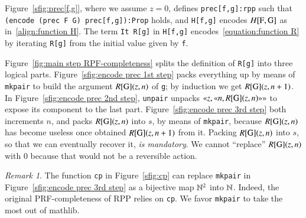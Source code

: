 \documentclass[preprint]{elsarticle}
\theoremstyle{remark}
\newtheorem{remark}{Remark}
\newcommand{\RPP}{\textsf{RPP}\xspace}
\newcommand{\PRF}{\textsf{PRF}\xspace}
\newcommand{\MATHLIB}{\textsf{mathlib}\xspace}
\begin{document}
Figure~\ref{sfig:prec[f,g]}, where we assume $ z = 0 $, defines \lstinline|prec[f,g]:rpp| such that \lstinline|(encode (prec F G) prec[f,g]):Prop| holds, and \lstinline|H[f,g]| encodes
$ H[\mbox{\lstinline|F|},\mbox{\lstinline|G|}]$ as in~\eqref{align:function H}.
The term \lstinline|It R[g]| in \lstinline|H[f,g]| encodes~\eqref{equation:function R} by iterating \lstinline|R[g]| from the initial value given by \lstinline|f|.


Figure~\ref{fig:main step RPF-completeness} splits the definition of \lstinline|R[g]| into three logical parts.
Figure~\ref{sfig:encode prec 1st step} packs everything up by means of \lstinline|mkpair| to build the argument $ R[\mbox{\lstinline|G|}](z,n) $ of \lstinline|g|; by induction we get
$ R[\mbox{\lstinline|G|}](z,n+1) $.
In Figure~\ref{sfig:encode prec 2nd step}, \lstinline|unpair| unpacks $ \gl z, \gl n, R[\mbox{\lstinline|G|}](z,n) \gr \gr $ to expose its component to the last part.
Figure~\ref{sfig:encode prec 3rd step} both increments $ n $, and packs $ R[\mbox{\lstinline|G|}](z,n) $ into $ s $, by means of \lstinline|mkpair|, because $ R[\mbox{\lstinline|G|}](z,n) $ has become useless once obtained $ R[\mbox{\lstinline|G|}](z,n+1) $ from it. Packing $ R[\mbox{\lstinline|G|}](z,n) $ into $ s $, so that we can eventually recover it, \emph{is mandatory}. We cannot ``replace'' $ R[\mbox{\lstinline|G|}](z,n) $ with $ 0 $ because that would not be a reversible action.

\begin{remark}
The function \lstinline|cp| in Figure~\ref{sfig:cp} can replace \lstinline|mkpair| in Figure~\ref{sfig:encode prec 3rd step} as a bijective map $ \mathbb{N}^2$ into $\mathbb{N}$. Indeed, the original \PRF-completeness of \RPP relies on \lstinline|cp|. We favor \lstinline|mkpair| to take the most out of \MATHLIB.
\end{remark}
\end{document}
